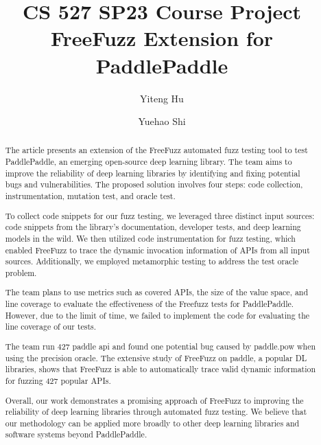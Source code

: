 \documentclass[sigconf]{acmart}
\begin{document}
\title{CS 527 SP23 Course Project \\ FreeFuzz Extension for PaddlePaddle}
\author{Yiteng Hu}
\author{Yuehao Shi}
\authornotemark[1]

\renewcommand{\shortauthors}{Hu and Shi, et al.}

\begin{abstract}
  The article presents an extension of the FreeFuzz automated fuzz testing tool to test PaddlePaddle, 
  an emerging open-source deep learning library. The team aims to improve the reliability of deep learning 
  libraries by identifying and fixing potential bugs and vulnerabilities. The proposed solution involves 
  four steps: code collection, instrumentation, mutation test, and oracle test. 

To collect code snippets for our fuzz testing, we leveraged three distinct input sources: code snippets from the library's documentation, developer tests, and deep learning models in the wild. 
We then utilized code instrumentation for fuzz testing, which enabled FreeFuzz to trace the dynamic invocation information of APIs from all input sources. 
Additionally, we employed metamorphic testing to address the test oracle problem.

  The team plans to use metrics such as covered APIs, the size of the value space, and line coverage to evaluate the effectiveness 
  of the Freefuzz tests for PaddlePaddle. However, due to the limit of time, we failed to implement the code for evaluating the line coverage of our tests.

  The team run 427 paddle api and found one potential bug caused by paddle.pow when using the precision oracle.
  The extensive study of FreeFuzz on paddle, a popular DL libraries, shows that FreeFuzz is able to automatically trace valid
  dynamic information for fuzzing 427 popular APIs. 

  Overall, our work demonstrates a promising approach of FreeFuzz to improving the reliability of deep learning libraries through automated fuzz testing. We believe that our methodology can be applied more broadly to other deep learning libraries and software systems beyond PaddlePaddle.
\end{abstract}
\end{document}

